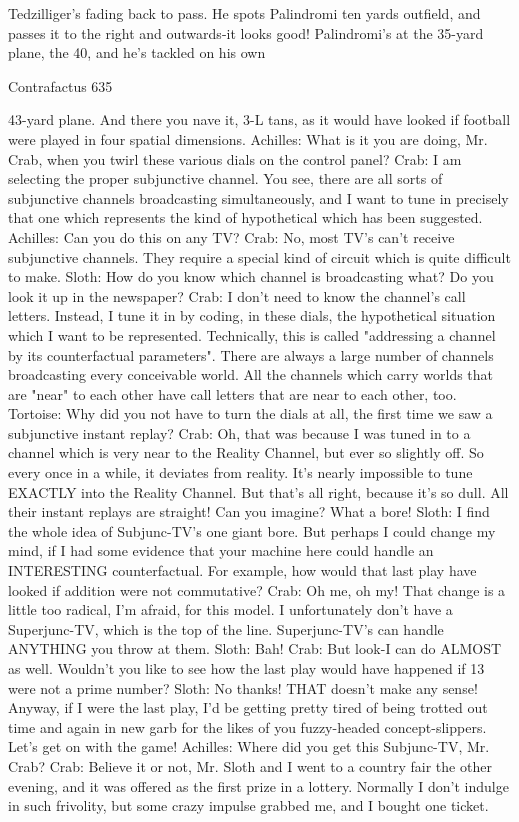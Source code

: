 Tedzilliger's fading back to pass. He spots Palindromi ten yards outfield, and passes it to
  the right and outwards-it looks good! Palindromi's at the 35-yard plane, the 40, and
  he's tackled on his own




Contrafactus                                                                              635

   43-yard plane. And there you nave it, 3-L tans, as it would have looked if football
   were played in four spatial dimensions.
Achilles: What is it you are doing, Mr. Crab, when you twirl these various dials on the
   control panel?
Crab: I am selecting the proper subjunctive channel. You see, there are all sorts of
   subjunctive channels broadcasting simultaneously, and I want to tune in precisely that
   one which represents the kind of hypothetical which has been suggested.
Achilles: Can you do this on any TV?
Crab: No, most TV's can't receive subjunctive channels. They require a special kind of
   circuit which is quite difficult to make.
Sloth: How do you know which channel is broadcasting what? Do you look it up in the
   newspaper?
Crab: I don't need to know the channel's call letters. Instead, I tune it in by coding, in
   these dials, the hypothetical situation which I want to be represented. Technically, this
   is called "addressing a channel by its counterfactual parameters". There are always a
   large number of channels broadcasting every conceivable world. All the channels
   which carry worlds that are "near" to each other have call letters that are near
to each other, too.
Tortoise: Why did you not have to turn the dials at all, the first time we saw a subjunctive
   instant replay?
Crab: Oh, that was because I was tuned in to a channel which is very near to the Reality
   Channel, but ever so slightly off. So every once in a while, it deviates from reality. It's
   nearly impossible to tune EXACTLY into the Reality Channel. But that's all right,
   because it's so dull. All their instant replays are straight! Can you imagine? What a
   bore!
Sloth: I find the whole idea of Subjunc-TV's one giant bore. But perhaps I could change
   my mind, if I had some evidence that your machine here could handle an
   INTERESTING counterfactual. For example, how would that last play have looked if
   addition were not commutative?
Crab: Oh me, oh my! That change is a little too radical, I'm afraid, for this model. I
   unfortunately don't have a Superjunc-TV, which is the top of the line. Superjunc-TV's
   can handle ANYTHING you throw at them.
Sloth: Bah!
Crab: But look-I can do ALMOST as well. Wouldn't you like to see how the last play
   would have happened if 13 were not a prime number? Sloth: No thanks! THAT
   doesn't make any sense! Anyway, if I were the last play, I'd be getting pretty tired of
   being trotted out time and again in new garb for the likes of you fuzzy-headed
   concept-slippers. Let's get on with the game!
Achilles: Where did you get this Subjunc-TV, Mr. Crab?
Crab: Believe it or not, Mr. Sloth and I went to a country fair the other evening, and it
   was offered as the first prize in a lottery. Normally I don't indulge in such frivolity, but
   some crazy impulse grabbed me, and I bought one ticket.




